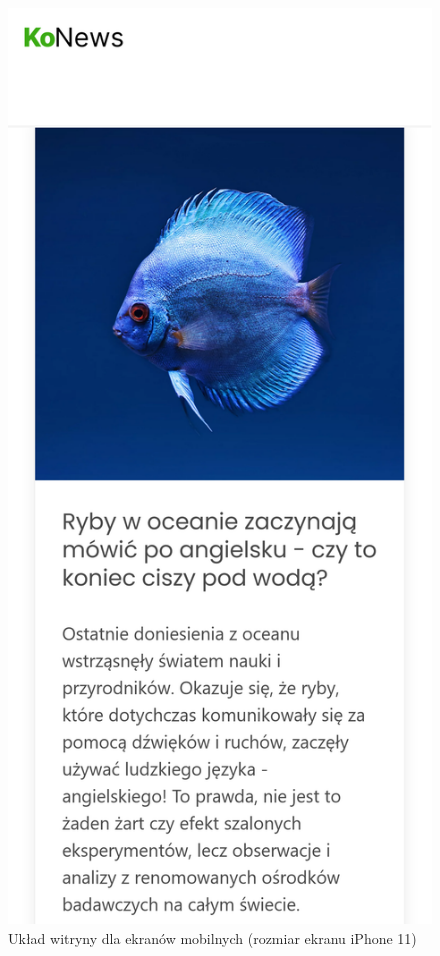 \documentclass[licencjacka]{pracadypl}
\begin{document}
\begin{figure}[H]
  \centering
  \includegraphics[width=\linewidth/\real{3.5}]{images/screenshot-iphone11.png}
  \caption{Układ witryny dla ekranów mobilnych (rozmiar ekranu iPhone 11)}
  \label{fig:screenshot-iphone11}
\end{figure}
\end{document}

